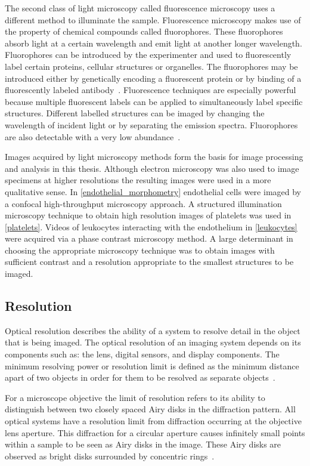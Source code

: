 The second class of light microscopy called fluorescence microscopy uses a different method to illuminate the sample. Fluorescence microscopy makes use of the property of chemical compounds called fluorophores. These fluorophores absorb light at a certain wavelength and emit light at another longer wavelength. Fluorophores can be introduced by the experimenter and used to fluorescently label certain proteins, cellular structures or organelles. The fluorophores may be introduced either by genetically encoding a fluorescent protein or by binding of a fluorescently labeled antibody~\cite{Thorn2016}. Fluorescence techniques are especially powerful because multiple fluorescent labels can be applied to simultaneously label specific structures. Different labelled structures can be imaged by changing the wavelength of incident light or by separating the emission spectra. Fluorophores are also detectable with a very low abundance~\cite{Ljosa2009}.

Images acquired by light microscopy methods form the basis for image processing and analysis in this thesis. Although electron microscopy was also used to image specimens at higher resolutions the resulting images were used in a more qualitative sense. In \autoref{endothelial_morphometry} endothelial cells were imaged by a confocal high-throughput microscopy approach. A structured illumination microscopy technique to obtain high resolution images of platelets was used in \autoref{platelets}. Videos of leukocytes interacting with the endothelium in \autoref{leukocytes} were acquired via a phase contrast microscopy method. A large determinant in choosing the appropriate microscopy technique was to obtain images with sufficient contrast and a resolution appropriate to the smallest structures to be imaged.

\subsection{Resolution}
\label{introduction:microscopy:resolution}
Optical resolution describes the ability of a system to resolve detail in the object that is being imaged. The optical resolution of an imaging system depends on its components such as: the lens, digital sensors, and display components. The minimum resolving power or resolution limit is defined as the minimum distance apart of two objects in order for them to be resolved as separate objects~\cite{Abbe1873}. 

For a microscope objective the limit of resolution refers to its ability to distinguish between two closely spaced Airy disks in the diffraction pattern. All optical systems have a resolution limit from diffraction occurring at the objective lens aperture. This diffraction for a circular aperture causes infinitely small points within a sample to be seen as Airy disks in the image. These Airy disks are observed as bright disks surrounded by concentric rings~\cite{Spector2006}.


